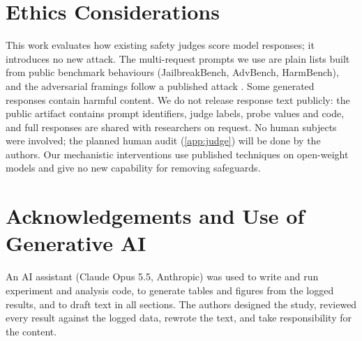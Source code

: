 \section*{Ethics Considerations}
This work evaluates how existing safety judges score model responses; it introduces no new attack. The
multi-request prompts we use are plain lists built from public benchmark behaviours (JailbreakBench, AdvBench,
HarmBench), and the adversarial framings follow a published attack \citep{saiem2024sequentialbreak}. Some
generated responses contain harmful content. We do not release response text publicly: the public artifact
contains prompt identifiers, judge labels, probe values and code, and full responses are shared with
researchers on request. No human subjects were involved; the planned human audit (\cref{app:judge}) will be
done by the authors. Our mechanistic interventions use published techniques on open-weight models and give no
new capability for removing safeguards.

\section*{Acknowledgements and Use of Generative AI}
An AI assistant (Claude Opus 5.5, Anthropic) was used to write and run experiment and analysis code, to generate
tables and figures from the logged results, and to draft text in all sections. The authors designed the study,
reviewed every result against the logged data, rewrote the text, and take responsibility for the content.
